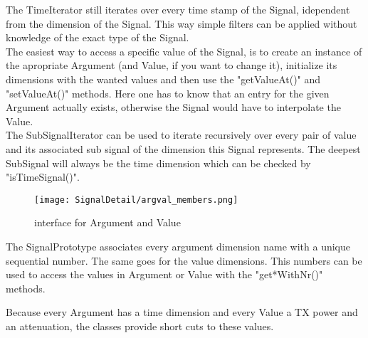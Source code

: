 The TimeIterator still iterates over every time stamp of the Signal, idependent from the dimension of the Signal. This way simple filters can be applied without knowledge of the exact type of the Signal.\\

The easiest way to access a specific value of the Signal, is to create an instance of the apropriate Argument (and Value, if you want to change it), initialize its dimensions with the wanted values and then use the "getValueAt()" and "setValueAt()" methods. Here one has to know that an entry for the given Argument actually exists, otherwise the Signal would have to interpolate the Value.\\

The SubSignalIterator can be used to iterate recursively over every pair of value and its associated sub signal of the dimension this Signal represents. The deepest SubSignal will always be the time dimension which can be checked by "isTimeSignal()".

\begin{figure}[H]
 \centering
 \texttt{[image: SignalDetail/argval\_members.png]}
 \caption{interface for Argument and Value}
 \label{fig: arg and val members}
\end{figure}

The SignalPrototype associates every argument dimension name with a unique sequential number. The same goes for the value dimensions.
This numbers can be used to access the values in Argument or Value with the "get*WithNr()" methods.

Because every Argument has a time dimension and every Value a TX power and an attenuation, the classes provide short cuts to these values.
